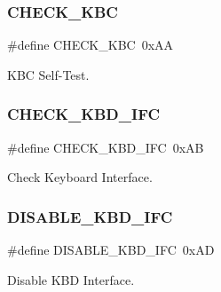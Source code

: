 \hypertarget{group__i8042_ga55fefff08c94153a53592686472a6c80}{}\label{group__i8042_ga55fefff08c94153a53592686472a6c80} 
\subsubsection{\texorpdfstring{C\+H\+E\+C\+K\+\_\+\+K\+BC}{CHECK\_KBC}}
{\footnotesize\ttfamily \#define C\+H\+E\+C\+K\+\_\+\+K\+BC~0x\+AA}



K\+BC Self-\/\+Test. 

\hypertarget{group__i8042_ga9d7a05f478671e387655b18be212693a}{}\label{group__i8042_ga9d7a05f478671e387655b18be212693a} 
\subsubsection{\texorpdfstring{C\+H\+E\+C\+K\+\_\+\+K\+B\+D\+\_\+\+I\+FC}{CHECK\_KBD\_IFC}}
{\footnotesize\ttfamily \#define C\+H\+E\+C\+K\+\_\+\+K\+B\+D\+\_\+\+I\+FC~0x\+AB}



Check Keyboard Interface. 

\hypertarget{group__i8042_ga816c9396155ea8f3a2e0a6351df3c716}{}\label{group__i8042_ga816c9396155ea8f3a2e0a6351df3c716} 
\subsubsection{\texorpdfstring{D\+I\+S\+A\+B\+L\+E\+\_\+\+K\+B\+D\+\_\+\+I\+FC}{DISABLE\_KBD\_IFC}}
{\footnotesize\ttfamily \#define D\+I\+S\+A\+B\+L\+E\+\_\+\+K\+B\+D\+\_\+\+I\+FC~0x\+AD}



Disable K\+BD Interface. 

\hypertarget{group__i8042_ga88ccb7cfaafc37d4f31f61191018b4ff}{}\label{group__i8042_ga88ccb7cfaafc37d4f31f61191018b4ff} 
